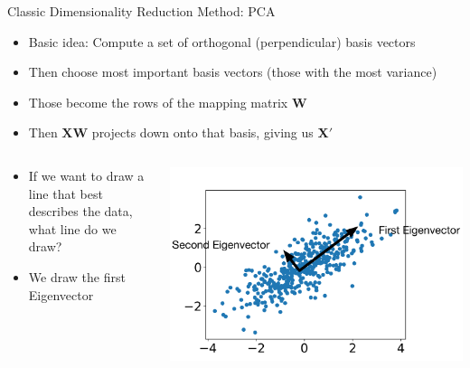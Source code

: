 \documentclass[aspectratio=169]{beamer}
\begin{document}
\begin{frame}{Classic Dimensionality Reduction Method: PCA}

\begin{itemize}
\item Basic idea: Compute a set of orthogonal (perpendicular) basis vectors
\item Then choose most important basis vectors (those with the most variance)
\item Those become the rows of the mapping matrix $\textbf{W}$
\item Then $\textbf{X} \textbf{W}$ projects down onto that basis, giving us \textbf{X$'$}
\end{itemize}
\begin{columns}
\begin{column}{0.5\textwidth}
\begin{itemize}
\item If we want to draw a line that best describes the data, what line do we draw? 
\item We draw the first Eigenvector
\end{itemize}
\end{column}
\begin{column}{0.5\textwidth}
\includegraphics[width=1\textwidth]{lectDimRed/Data2.pdf}
\end{column}
\end{columns}
\end{frame}
\end{document}
